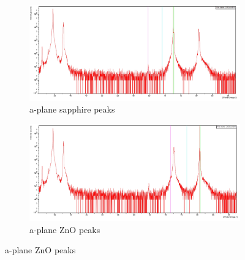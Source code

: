 \documentclass{article}
\begin{document}
\begin{figure}[h]
    \centering
    \begin{subfigure}[b]{0.45\textwidth}
        \centering
        \includegraphics[width=\textwidth]{Figures/a-plane-sapphire-peaks.jpg} %
        \caption{a-plane sapphire peaks}
        \label{fig:subfig1}
    \end{subfigure}
    \hfill
    \begin{subfigure}[b]{0.45\textwidth}
        \centering
        \includegraphics[width=\textwidth]{Figures/a-plane-ZnO-peaks.jpg} %
        \caption{a-plane ZnO peaks}
        \label{fig:subfig2}
    \end{subfigure}
    
    \vspace{1em} %


\end{figure}
\end{document}

